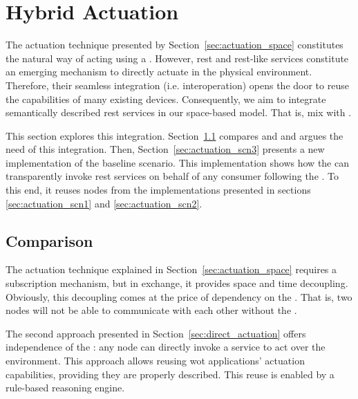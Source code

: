 \section{Hybrid Actuation}
\label{sec:hybrid_actuation}

The actuation technique presented by Section~\ref{sec:actuation_space} constitutes the natural way of acting using a \Space{}.
However, \ac{rest} and \ac{rest}-like services constitute an emerging mechanism to directly actuate in the physical environment.
Therefore, their seamless integration (i.e. interoperation) opens the door to reuse the capabilities of many existing devices.
Consequently, we aim to integrate semantically described \ac{rest} services in our space-based model. %
That is, mix \spaceActuation{} with \restActuation{}.


This section explores this integration.
Section~\ref{sec:actuation_comparison} compares \spaceActuation{} and \restActuation{} and argues the need of this integration.
Then, Section~\ref{sec:actuation_scn3} presents a new implementation of the baseline scenario.
This implementation shows how the \Space{} can transparently invoke \ac{rest} services on behalf of any consumer following the \spaceActuation{}.
To this end, it reuses nodes from the implementations presented in sections \ref{sec:actuation_scn1} and \ref{sec:actuation_scn2}.


\subsection{Comparison}
\label{sec:actuation_comparison}

The actuation technique explained in Section~\ref{sec:actuation_space} requires a subscription mechanism, but in exchange, it provides space and time decoupling.
Obviously, this decoupling comes at the price of dependency on the \Space{}.
That is, two nodes will not be able to communicate with each other without the \Space{}.


The second approach presented in Section~\ref{sec:direct_actuation} offers independence of the \Space{}: any node can directly invoke a service to act over the environment.
This approach allows reusing \ac{wot} applications' actuation capabilities, providing they are properly described. %
This reuse is enabled by a rule-based reasoning engine. %


